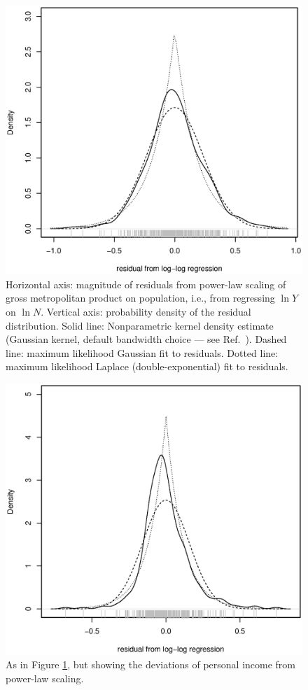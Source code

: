 \documentclass{pnastwo}
\begin{document}
\begin{figure}
\includegraphics[width=\columnwidth]{distribution-of-residuals}
\caption{Horizontal axis: magnitude of residuals from power-law scaling of
  gross metropolitan product on population, i.e., from regressing $\ln{Y}$ on
  $\ln{N}$.  Vertical axis: probability density of the residual distribution.
  Solid line: Nonparametric kernel density estimate (Gaussian kernel, default
  bandwidth choice --- see Ref.\ \cite{Simonoff-on-smoothing}).  Dashed line:
  maximum likelihood Gaussian fit to residuals.  Dotted line: maximum
  likelihood Laplace (double-exponential) fit to residuals.}
\label{fig:distribution-of-residuals}
\end{figure}

\begin{figure}
  \includegraphics[width=\columnwidth]{residuals-for-income}
  \caption{As in Figure \ref{fig:distribution-of-residuals}, but showing the
    deviations of personal income from power-law scaling.}
\label{fig:residuals-for-income}
\end{figure}
\end{document}

